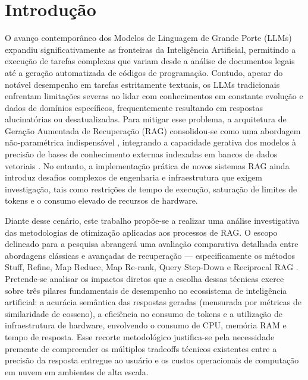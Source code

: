 \newpage
\section{Introdução}
\label{sc:introducao}

O avanço contemporâneo dos Modelos de Linguagem de Grande Porte (LLMs) expandiu significativamente as fronteiras da Inteligência Artificial, permitindo a execução de tarefas complexas que variam desde a análise de documentos legais até a geração automatizada de códigos de programação. Contudo, apesar do notável desempenho em tarefas estritamente textuais, os LLMs tradicionais enfrentam limitações severas ao lidar com conhecimentos em constante evolução e dados de domínios específicos, frequentemente resultando em respostas alucinatórias ou desatualizadas. Para mitigar esse problema, a arquitetura de Geração Aumentada de Recuperação (RAG) consolidou-se como uma abordagem não-paramétrica indispensável \cite{andriopoulos2023augmenting}, integrando a capacidade gerativa dos modelos à precisão de bases de conhecimento externas indexadas em bancos de dados vetoriais \cite{ma2024vectorsurvey}. No entanto, a implementação prática de novos sistemas RAG ainda introduz desafios complexos de engenharia e infraestrutura que exigem investigação, tais como restrições de tempo de execução, saturação de limites de tokens e o consumo elevado de recursos de hardware.  

Diante desse cenário, este trabalho propõe-se a realizar uma análise investigativa das metodologias de otimização aplicadas aos processos de RAG. O escopo delineado para a pesquisa abrangerá uma avaliação comparativa detalhada entre abordagens clássicas e avançadas de recuperação — especificamente os métodos Stuff, Refine, Map Reduce, Map Re-rank, Query Step-Down e Reciprocal RAG \cite{topsakal2023langchain}. Pretende-se analisar os impactos diretos que a escolha dessas técnicas exerce sobre três pilares fundamentais de desempenho no ecossistema de inteligência artificial: a acurácia semântica das respostas geradas (mensurada por métricas de similaridade de cosseno), a eficiência no consumo de tokens e a utilização de infraestrutura de hardware, envolvendo o consumo de CPU, memória RAM e tempo de resposta. Esse recorte metodológico justifica-se pela necessidade premente de compreender os múltiplos tradeoffs técnicos existentes entre a precisão da resposta entregue ao usuário e os custos operacionais de computação em nuvem em ambientes de alta escala.  

